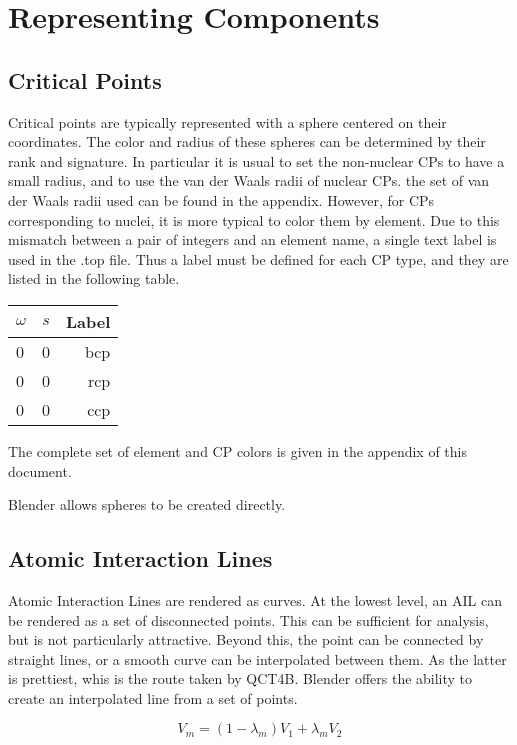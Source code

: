 \documentclass{report}
\begin{document}
\section{Representing Components}

\subsection{Critical Points}
Critical points are typically represented with a sphere centered on their coordinates.
The color and radius of these spheres can be determined by their rank and signature.
In particular it is usual to set the non-nuclear CPs to have a small radius, and to use the van der Waals radii of nuclear CPs.
the set of van der Waals radii used can be found in the appendix.
However, for CPs corresponding to nuclei, it is more typical to color them by element.
Due to this mismatch between a pair of integers and an element name, a single text label is used in the .top file.
Thus a label must be defined for each CP type, and they are listed in the following table.

\begin{tabular}{ l c || r }
$\omega$ & $s$ & Label \\
\hline
0 & 0 & bcp \\
0 & 0 & rcp \\
0 & 0 & ccp \\
\end{tabular}

The complete set of element and CP colors is given in the appendix of this document.

Blender allows spheres to be created directly.

\subsection{Atomic Interaction Lines}

Atomic Interaction Lines are rendered as curves.
At the lowest level, an AIL can be rendered as a set of disconnected points.
This can be sufficient for analysis, but is not particularly attractive.
Beyond this, the point can be connected by straight lines, or a smooth curve can be interpolated between them.
As the latter is prettiest, whis is the route taken by QCT4B.
Blender offers the ability to create an interpolated line from a set of points.

\begin{equation}
V_{m} = (1 - \lambda_{m}) V_{1} + \lambda_{m} V_{2}
\end{equation}
\end{document}
